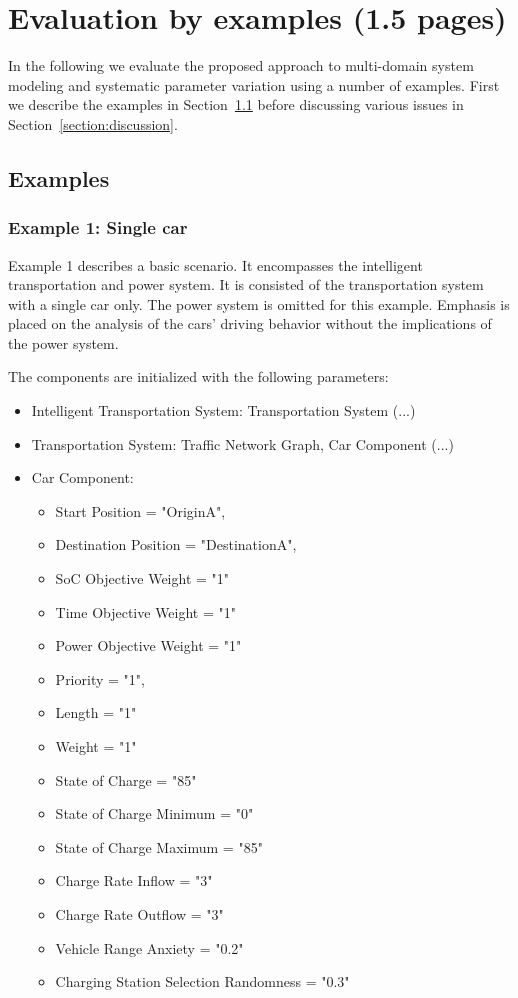 \section{Evaluation by examples (1.5 pages)}
\label{section:evaluation}

In the following we evaluate the proposed approach to multi-domain system modeling and systematic parameter variation using a number of examples. First we describe the examples in Section~\ref{section:examples} before discussing various issues in Section~\ref{section:discussion}.

\subsection{Examples}
\label{section:examples}

\subsubsection{Example 1: Single car}
Example 1 describes a basic scenario. It encompasses the intelligent transportation and power system. It is consisted of the transportation system with a single car only. The power system is omitted for this example.
Emphasis is placed on the analysis of the cars' driving behavior without the implications of the power system. 

The components are initialized with the following parameters:

\begin{itemize}
	\item Intelligent Transportation System: Transportation System (...)
	\item Transportation System: Traffic Network Graph, Car Component (...)
	\item Car Component:
	\begin{itemize}  
		\item Start Position = "OriginA", 
		\item Destination Position = "DestinationA",
		\item SoC Objective Weight = "1" 
		\item Time Objective Weight = "1" 
		\item Power Objective Weight = "1"
		\item Priority = "1",
		\item Length = "1"
		\item Weight = "1"
		\item State of Charge = "85"
		\item State of Charge Minimum = "0"
		\item State of Charge Maximum = "85" 
		\item Charge Rate Inflow = "3" 
		\item Charge Rate Outflow = "3" 
		\item Vehicle Range Anxiety = "0.2" 
		\item Charging Station Selection Randomness = "0.3"
	\end{itemize}
\end{itemize}

